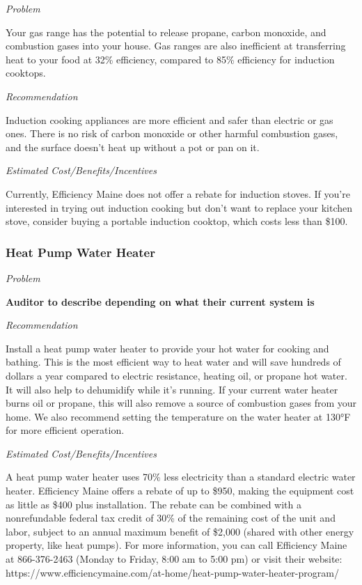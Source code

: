 \documentclass[
  letterpaper,
  DIV=11,
  numbers=noendperiod]{scrartcl}
\begin{document}
\emph{Problem}

Your gas range has the potential to release propane, carbon monoxide,
and combustion gases into your house. Gas ranges are also inefficient at
transferring heat to your food at 32\% efficiency, compared to 85\%
efficiency for induction cooktops.

\emph{Recommendation}

Induction cooking appliances are more efficient and safer than electric
or gas ones. There is no risk of carbon monoxide or other harmful
combustion gases, and the surface doesn't heat up without a pot or pan
on it.

\emph{Estimated Cost/Benefits/Incentives}

Currently, Efficiency Maine does not offer a rebate for induction
stoves. If you're interested in trying out induction cooking but don't
want to replace your kitchen stove, consider buying a portable induction
cooktop, which costs less than \$100.

\subsubsection{Heat Pump Water Heater}\label{heat-pump-water-heater}

\emph{Problem}

\textbf{Auditor to describe depending on what their current system is}

\emph{Recommendation}

Install a heat pump water heater to provide your hot water for cooking
and bathing. This is the most efficient way to heat water and will save
hundreds of dollars a year compared to electric resistance, heating oil,
or propane hot water. It will also help to dehumidify while it's
running. If your current water heater burns oil or propane, this will
also remove a source of combustion gases from your home. We also
recommend setting the temperature on the water heater at 130°F for more
efficient operation.

\emph{Estimated Cost/Benefits/Incentives}

A heat pump water heater uses 70\% less electricity than a standard
electric water heater. Efficiency Maine offers a rebate of up to \$950,
making the equipment cost as little as \$400 plus installation. The
rebate can be combined with a nonrefundable federal tax credit of 30\%
of the remaining cost of the unit and labor, subject to an annual
maximum benefit of \$2,000 (shared with other energy property, like heat
pumps). For more information, you can call Efficiency Maine at
866-376-2463 (Monday to Friday, 8:00 am to 5:00 pm) or visit their
website:
https://www.efficiencymaine.com/at-home/heat-pump-water-heater-program/
\end{document}
